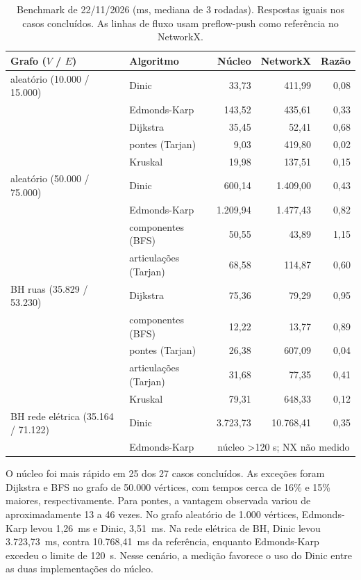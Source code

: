 \documentclass[12pt]{article}
\begin{document}
\begin{table}[ht]
\centering
\caption{Benchmark de 22/11/2026 (ms, mediana de 3 rodadas). Respostas iguais nos casos concluídos. As linhas de fluxo usam preflow-push como referência no NetworkX.}
\label{tab:bench}
\small\setlength{\tabcolsep}{4pt}
\begin{tabularx}{\textwidth}{Xlrrr}
\toprule
\textbf{Grafo ($V$ / $E$)} & \textbf{Algoritmo} & \textbf{Núcleo} & \textbf{NetworkX} & \textbf{Razão} \\
\midrule
aleatório (10.000 / 15.000) & Dinic & 33,73 & 411,99 & 0,08 \\
 & Edmonds-Karp & 143,52 & 435,61 & 0,33 \\
 & Dijkstra & 35,45 & 52,41 & 0,68 \\
 & pontes (Tarjan) & 9,03 & 419,80 & 0,02 \\
 & Kruskal & 19,98 & 137,51 & 0,15 \\
\midrule
aleatório (50.000 / 75.000) & Dinic & 600,14 & 1.409,00 & 0,43 \\
 & Edmonds-Karp & 1.209,94 & 1.477,43 & 0,82 \\
 & componentes (BFS) & 50,55 & 43,89 & 1,15 \\
 & articulações (Tarjan) & 68,58 & 114,87 & 0,60 \\
\midrule
BH ruas (35.829 / 53.230) & Dijkstra & 75,36 & 79,29 & 0,95 \\
 & componentes (BFS) & 12,22 & 13,77 & 0,89 \\
 & pontes (Tarjan) & 26,38 & 607,09 & 0,04 \\
 & articulações (Tarjan) & 31,68 & 77,35 & 0,41 \\
 & Kruskal & 79,31 & 648,33 & 0,12 \\
\midrule
BH rede elétrica (35.164 / 71.122) & Dinic & 3.723,73 & 10.768,41 & 0,35 \\
 & Edmonds-Karp & \multicolumn{3}{c}{núcleo >120 s; NX não medido} \\
\bottomrule
\end{tabularx}
\end{table}

O núcleo foi mais rápido em 25 dos 27 casos concluídos. As exceções foram Dijkstra e BFS no grafo de 50.000 vértices, com tempos cerca de 16\% e 15\% maiores, respectivamente. Para pontes, a vantagem observada variou de aproximadamente 13 a 46 vezes. No grafo aleatório de 1.000 vértices, Edmonds-Karp levou 1,26~ms e Dinic, 3,51~ms. Na rede elétrica de BH, Dinic levou 3.723,73~ms, contra 10.768,41~ms da referência, enquanto Edmonds-Karp excedeu o limite de 120~s. Nesse cenário, a medição favorece o uso do Dinic entre as duas implementações do núcleo.
\end{document}
